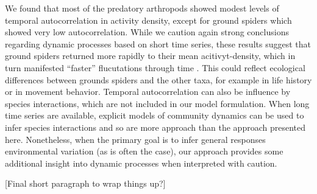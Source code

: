 We found that most of the predatory arthropods showed modest levels of temporal
autocorrelation in activity density,
except for ground spiders which showed very low autocorrelation.
While we caution again strong conclusions regarding dynamic processes based on short
time series,
these results suggest that ground spiders returned more rapidly to their mean
acitivyt-density,
which in turn manifested ``faster'' flucutations through time \citep{}.
This could reflect ecological differences between grounds spiders and the other taxa,
for example in life history or in movement behavior.
Temporal autocorrelation can also be influence by species interactions,
which are not included in our model formulation.
When long time series are available,
explicit models of community dynamics can be used to infer species interactions
and so are more approach than the approach presented here.
Nonetheless, when the primary goal is to infer general responses environmental variation
(as is often the case),
our approach provides some additional insight into dynamic processes
when interpreted with caution.

[Final short paragraph to wrap things up?]








